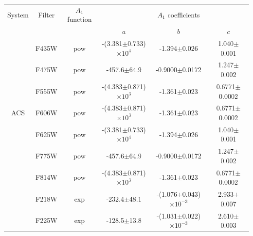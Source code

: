 \documentclass[a4paper, 11pt, oneside]{LJMU_Astro_Thesis}  %
\begin{document}
\begin{table}
\begin{center}
\begin{tabular}{cccccc}
\hline
System & Filter & $A_{1}$ function & & $A_{1}$ coefficients & \\
 & & & $a$ & $b$ & $c$ \\
\hline

& F435W & pow & -(3.381$\pm$0.733)$\times 10^{4}$ & -1.394$\pm$0.026 & 1.040$\pm$0.001 \\
& F475W & pow & -457.6$\pm$64.9 & -0.9000$\pm$0.0172 & 1.247$\pm$0.002 \\
& F555W & pow & -(4.383$\pm$0.871)$\times 10^{3}$ & -1.361$\pm$0.023 & 0.6771$\pm$0.0002 \\
ACS & F606W & pow & -(4.383$\pm$0.871)$\times 10^{3}$ & -1.361$\pm$0.023 & 0.6771$\pm$0.0002 \\
& F625W & pow & -(3.381$\pm$0.733)$\times 10^{4}$ & -1.394$\pm$0.026 & 1.040$\pm$0.001 \\
& F775W & pow & -457.6$\pm$64.9 & -0.9000$\pm$0.0172 & 1.247$\pm$0.002 \\
& F814W & pow & -(4.383$\pm$0.871)$\times 10^{3}$ & -1.361$\pm$0.023 & 0.6771$\pm$0.0002 \\ \hline
& F218W & exp & -232.4$\pm$48.1 & -(1.076$\pm$0.043)$\times 10^{-3}$ & 2.933$\pm$0.007 \\
& F225W & exp & -128.5$\pm$13.8 & -(1.031$\pm$0.022)$\times 10^{-3}$ & 2.610$\pm$0.003 \\

\end{tabular}
\end{center}
\end{table}
\end{document}
